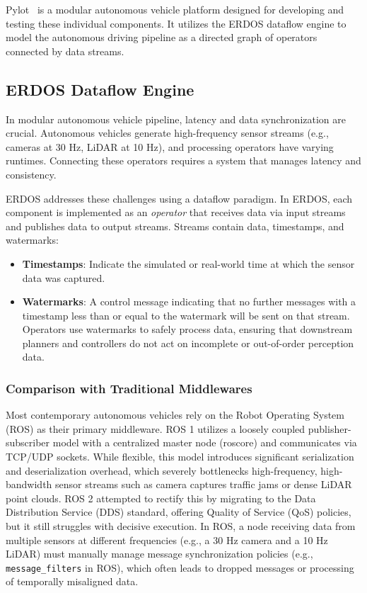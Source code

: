 \documentclass[11pt,a4paper]{report}
\begin{document}
Pylot~\cite{erdos_pylot} is a modular autonomous vehicle platform designed for developing and testing these individual components. It utilizes the ERDOS dataflow engine to model the autonomous driving pipeline as a directed graph of operators connected by data streams.

\subsection{ERDOS Dataflow Engine}
In modular autonomous vehicle pipeline, latency and data synchronization are crucial. Autonomous vehicles generate high-frequency sensor streams (e.g., cameras at 30 Hz, LiDAR at 10 Hz), and processing operators have varying runtimes. Connecting these operators requires a system that manages latency and consistency.

ERDOS addresses these challenges using a dataflow paradigm. In ERDOS, each component is implemented as an \textit{operator} that receives data via input streams and publishes data to output streams. Streams contain data, timestamps, and watermarks:
\begin{itemize}
    \item \textbf{Timestamps}: Indicate the simulated or real-world time at which the sensor data was captured.
    \item \textbf{Watermarks}: A control message indicating that no further messages with a timestamp less than or equal to the watermark will be sent on that stream. Operators use watermarks to safely process data, ensuring that downstream planners and controllers do not act on incomplete or out-of-order perception data.
\end{itemize}

\subsubsection{Comparison with Traditional Middlewares}
Most contemporary autonomous vehicles rely on the Robot Operating System (ROS) as their primary middleware. ROS 1 utilizes a loosely coupled publisher-subscriber model with a centralized master node (roscore) and communicates via TCP/UDP sockets. While flexible, this model introduces significant serialization and deserialization overhead, which severely bottlenecks high-frequency, high-bandwidth sensor streams such as camera captures traffic jams or dense LiDAR point clouds. ROS 2 attempted to rectify this by migrating to the Data Distribution Service (DDS) standard, offering Quality of Service (QoS) policies, but it still struggles with decisive execution. In ROS, a node receiving data from multiple sensors at different frequencies (e.g., a 30 Hz camera and a 10 Hz LiDAR) must manually manage message synchronization policies (e.g., \texttt{message\_filters} in ROS), which often leads to dropped messages or processing of temporally misaligned data.
\end{document}
